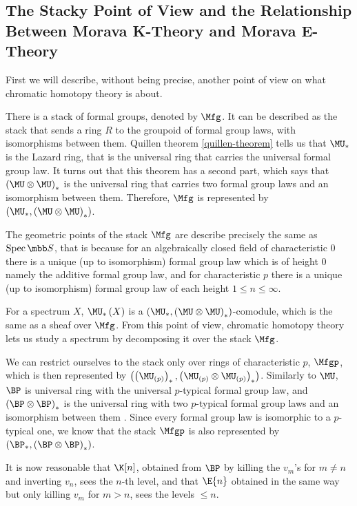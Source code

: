 \subsection{The Stacky Point of View and the Relationship Between Morava K-Theory and Morava E-Theory}

First we will describe, without being precise, another point of view on what chromatic homotopy theory is about.

There is a stack of formal groups, denoted by $\Mfg$.
It can be described as the stack that sends a ring $R$ to the groupoid of formal group laws, with isomorphisms between them.
Quillen theorem \ref{quillen-theorem} tells us that $\MU_*$ is the Lazard ring, that is the universal ring that carries the universal formal group law.
It turns out that this theorem has a second part, which says that $\left(\MU \otimes \MU\right)_*$ is the universal ring that carries two formal group laws and an isomorphism between them.
Therefore, $\Mfg$ is represented by $\left(\MU_*, \left(\MU \otimes \MU\right)_*\right)$.

The geometric points of the stack $\Mfg$ are describe precisely the same as $\spec \SS$, that is because for an algebraically closed field of characteristic $0$ there is a unique (up to isomorphism) formal group law which is of height $0$ namely the additive formal group law, and for characteristic $p$ there is a unique (up to isomorphism) formal group law of each height $1 \leq n \leq \infty$.

For a spectrum $X$, $\MU_*\left(X\right)$ is a $\left(\MU_*, \left(\MU \otimes \MU\right)_*\right)$-comodule, which is the same as a sheaf over $\Mfg$.
From this point of view, chromatic homotopy theory lets us study a spectrum by decomposing it over the stack $\Mfg$.

We can restrict ourselves to the stack only over rings of characteristic $p$, $\Mfgp$, which is then represented by $\left(\left(\MU_{\left(p\right)}\right)_*, \left(\MU_{\left(p\right)} \otimes \MU_{\left(p\right)}\right)_*\right)$. 
Similarly to $\MU$, $\BP$ is universal ring with the universal $p$-typical formal group law, and $\left(\BP \otimes \BP\right)_*$ is the universal ring with two $p$-typical formal group laws and an isomorphism between them .
Since every formal group law is isomorphic to a $p$-typical one, we know that the stack $\Mfgp$ is also represented by $\left(\BP_*, \left(\BP \otimes \BP\right)_*\right)$.

It is now reasonable that $\K[n]$, obtained from $\BP$ by killing the $v_m$'s for $m \neq n$ and inverting $v_n$, sees the $n$-th level, and that $\E{n}$ obtained in the same way but only killing $v_m$ for $m > n$, sees the levels $\leq n$.

